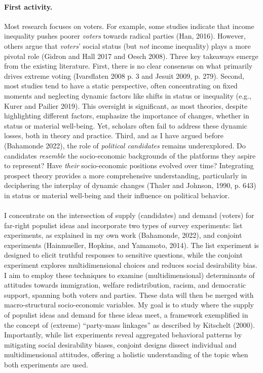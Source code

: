 \documentclass[letterpaper]{article}
\begin{document}
\paragraph{First activity.} Most research focuses on voters. For example, some studies indicate that income inequality pushes poorer \emph{voters} towards radical parties (Han, 2016). However, others argue that \emph{voters}' social status (but \emph{not} income inequality) plays a more pivotal role (Gidron and Hall 2017 and Oesch 2008). Three key takeaways emerge from the existing literature. First, there is no clear consensus on what primarily drives extreme voting (Ivarsflaten 2008 p. 3 and Jesuit 2009, p. 279). Second, most studies tend to have a static perspective, often concentrating on fixed moments and neglecting dynamic factors like shifts in status or inequality (e.g., Kurer and Pailier 2019). This oversight is significant, as most theories, despite highlighting different factors, emphasize the importance of changes, whether in status or material well-being. Yet, scholars often fail to address these dynamic losses, both in theory and practice. Third, and as I have argued before (Bahamonde 2022), the role of \emph{political candidates} remains underexplored. Do candidates \emph{resemble} the socio-economic backgrounds of the platforms they aspire to represent? Have \emph{their} socio-economic positions evolved over time? Integrating prospect theory provides a more comprehensive understanding, particularly in deciphering the interplay of dynamic changes (Thaler and Johnson, 1990, p. 643) in status or material well-being and their influence on political behavior.

\paragraph{}I concentrate on the intersection of supply (candidates) and demand (voters) for far-right populist ideas and incorporate two types of survey experiments: list experiments, as explained in my own work (Bahamonde, 2022), and conjoint experiments (Hainmueller, Hopkins, and Yamamoto, 2014). The list experiment is designed to elicit truthful responses to sensitive questions, while the conjoint experiment explores multidimensional choices and reduces social desirability bias. I aim to employ these techniques to examine (multidimensional) determinants of attitudes towards immigration, welfare redistribution, racism, and democratic support, spanning both voters and parties. These data will then be merged with macro-structural socio-economic variables. My goal is to study where the supply of populist ideas and demand for these ideas meet, a framework exemplified in the concept of (extreme) “party-mass linkages” as described by Kitschelt (2000). Importantly, while list experiments reveal aggregated behavioral patterns by mitigating social desirability biases, conjoint designs dissect individual and multidimensional attitudes, offering a holistic understanding of the topic when both experiments are used.
\end{document}
